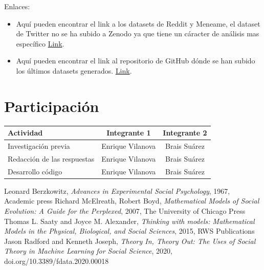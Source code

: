 \documentclass[a4paper,12pt]{article}
\begin{document}
Enlaces: 

\begin{itemize}

\item Aqu\'i pueden encontrar el link a los datasets de Reddit y Meneame, el dataset de Twitter no se ha subido a Zenodo ya que tiene un c\'aracter de an\'alisis mas espec\'ifico \href{https://zenodo.org/record/4243130}{Link}.

\item Aqu\'i pueden encontrar el link al repositorio de GitHub d\'onde se han subido los \'ultimos datasets generados. \href{https://zenodo.org/record/4243130}{Link}.

\end{itemize}

\section{Participaci\'on}

\begin{tabular}{|l|c|c|}\hline

Actividad& Integrante 1& Integrante 2\\\hline
Investigaci\'on previa & Enrique Vilanova & Brais Su\'arez \\\hline
Redacci\'on de las respuestas & Enrique Vilanova & Brais Su\'arez \\\hline
Desarrollo c\'odigo  & Enrique Vilanova & Brais Su\'arez \\\hline

\end{tabular}

\begin{thebibliography}{9}

 Leonard Berzkowitz,%
	\emph{ Advances in Experimental Social Psychology}, 1967,  Academic press
 Richard McElreath, Robert Boyd,%
	\emph{ Mathematical Models of Social Evolution: A Guide for the Perplexed}, 2007, The University of Chicago Press
Thomas L. Saaty and Joyce M. Alexander,%
	\emph{Thinking with models: Mathematical Models in the Physical, Biological, and Social Sciences}, 2015, RWS Publications
Jason Radford and Kenneth Joseph,%
	\emph{Theory In, Theory Out: The Uses of Social Theory in Machine Learning for Social Science}, 2020, doi.org/10.3389/fdata.2020.00018

\end{thebibliography}
\end{document}
